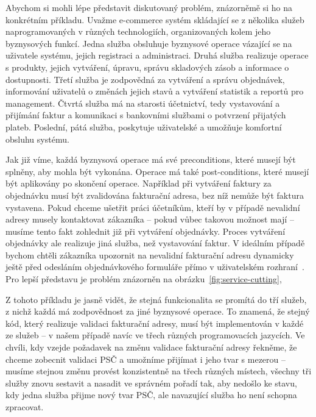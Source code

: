 Abychom si mohli lépe představit diskutovaný problém, znázorněmě
si ho na konkrétním příkladu. Uvažme e-commerce systém
skládající se z několika služeb naprogramovaných v různých technologiích,
organizovaných kolem jeho byznysových funkcí.
Jedna služba obsluhuje byznysové operace vázající
se na uživatele systému, jejich registraci a administraci. Druhá
služba realizuje operace s produkty, jejich vytváření, úpravu,
správu skladových zásob a informace o dostupnosti. Třetí služba je
zodpovědná za vytváření a správu objednávek, informování uživatelů
o změnách jejich stavů a vytváření statistik a reportů pro management.
Čtvrtá služba má na starosti účetnictví, tedy vystavování a přijímání
faktur a komunikaci s bankovními službami o potvrzení přijatých plateb.
Poslední, pátá služba, poskytuje uživatelské a umožňuje komfortní obsluhu systému.

Jak již víme, každá byznysová operace má své preconditions, které musejí být splněny,
aby mohla být vykonána. Operace má také post-conditions, které musejí být
aplikovány po skončení operace. Například při vytváření faktury za
objednávku musí být zvalidována fakturační adresa, bez níž nemůže
být faktura vystavena. Pokud chceme ušetřit práci účetníkům, kteří by
v případě nevalidní adresy musely kontaktovat zákazníka – pokud vůbec
takovou možnost mají – musíme tento fakt zohlednit již při vytváření objednávky.
Proces vytváření objednávky ale realizuje jiná služba, než vystavování faktur.
V ideálním případě bychom chtěli zákazníka upozornit na nevalidní fakturační
adresu dynamicky ještě před odesláním objednávkového formuláře přímo v uživatelském
rozhraní~\cite{cemus2017separation}. Pro lepší představu je problém znázorněn na
obrázku~\ref{fig:service-cutting},

Z tohoto příkladu je jasně vidět, že stejná funkcionalita se promítá
do tří služeb, z nichž každá má zodpovědnost za jiné byznysové operace.
To znamená, že stejný kód, který realizuje validaci fakturační adresy,
musí být implementován v každé ze služeb – v našem případě navíc ve třech
různých programovacích jazycích. Ve chvíli, kdy vzejde požadavek na změnu
validace fakturační adresy \textendash řekněme, že chceme zobecnit
validaci PSČ a umožníme přijímat i jeho tvar s mezerou – musíme stejnou změnu
provést konzistentně na třech různých místech, všechny tři služby znovu
sestavit a nasadit ve správném pořadí tak, aby nedošlo ke stavu,
kdy jedna služba přijme nový tvar PSČ, ale navazující služba ho není
schopna zpracovat.

